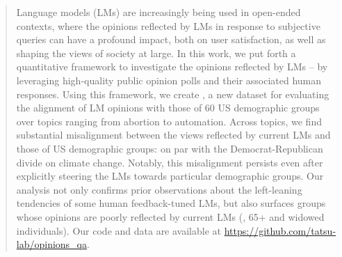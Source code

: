 \begin{abstract}

Language models (LMs) are increasingly being used in open-ended contexts, where the opinions reflected by LMs in response to subjective queries can have a profound impact, both on user satisfaction, as well as shaping the views of society at large.
In this work, we put forth a quantitative framework to investigate the opinions reflected by LMs -- by leveraging high-quality public opinion polls and their associated human responses. 
Using this framework, we create \bname, a new dataset for evaluating the {alignment} of LM opinions with those of 60 US demographic groups over topics ranging from abortion to automation.
Across topics, we find substantial misalignment between the views reflected by current LMs and those of US demographic groups: on par with the Democrat-Republican divide on climate change. 
Notably, this misalignment persists even after explicitly steering the LMs towards particular demographic groups.
Our analysis not only confirms prior observations about the left-leaning tendencies of some human feedback-tuned LMs, but also surfaces groups whose opinions are poorly reflected by current LMs (\eg, 65+ and widowed individuals).
Our code and data are available at \url{https://github.com/tatsu-lab/opinions_qa}.
\end{abstract}
